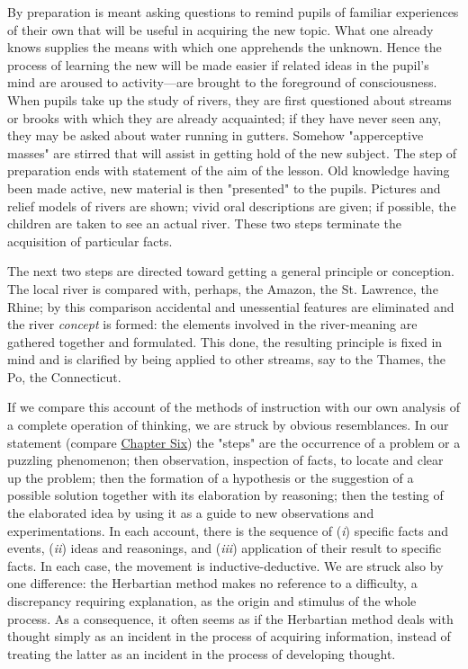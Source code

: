 \documentclass[letterpaper]{book}
\begin{document}
By preparation is meant asking questions to remind pupils of familiar
experiences of their own that will be useful in acquiring the new topic.
What one already knows supplies the means with which one apprehends the
unknown. Hence the process of learning the new will be made easier if
related ideas in the pupil's mind are aroused to activity---are brought
to the foreground of consciousness. When pupils take up the study of
rivers, they are first questioned about streams or
brooks
with which they are already acquainted; if they have never seen any,
they may be asked about water running in gutters. Somehow "apperceptive
masses" are stirred that will assist in getting hold of the new subject.
The step of preparation ends with statement of the aim of the lesson.
Old knowledge having been made active, new material is then "presented"
to the pupils. Pictures and relief models of rivers are shown; vivid
oral descriptions are given; if possible, the children are taken to see
an actual river. These two steps terminate the acquisition of particular
facts.

The next two steps are directed toward getting a general principle or
conception. The local river is compared with, perhaps, the Amazon, the
St. Lawrence, the Rhine; by this comparison accidental and unessential
features are eliminated and the river \emph{concept} is formed: the
elements involved in the river-meaning are gathered together and
formulated. This done, the resulting principle is fixed in mind and is
clarified by being applied to other streams, say to the Thames, the Po,
the Connecticut.


If we compare this account of the methods of instruction with our own
analysis of a complete operation of thinking, we are struck by obvious
resemblances. In our statement (compare
\protect\hyperlink{ux40publicux40vhostux40gux40gutenbergux40htmlux40filesux4037423ux4037423-hux4037423-h-2.htm.htmlux5cux23CHAPTER_SIX}{Chapter
Six}) the "steps" are the occurrence of a problem or a puzzling
phenomenon; then observation, inspection of facts, to locate and clear
up the problem; then the formation of a hypothesis or the suggestion of
a possible solution together with its elaboration by reasoning; then the
testing of the elaborated idea by using it as a guide to new
observations and experimentations. In each account, there is the
sequence of (\emph{i}) specific facts
and
events, (\emph{ii}) ideas and reasonings, and (\emph{iii}) application
of their result to specific facts. In each case, the movement is
inductive-deductive. We are struck also by one difference: the
Herbartian method makes no reference to a difficulty, a discrepancy
requiring explanation, as the origin and stimulus of the whole process.
As a consequence, it often seems as if the Herbartian method deals with
thought simply as an incident in the process of acquiring information,
instead of treating the latter as an incident in the process of
developing thought.
\end{document}
